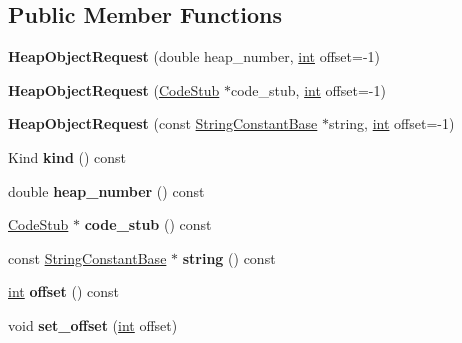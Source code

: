\subsection*{Public Member Functions}
\begin{DoxyCompactItemize}
\item 
\mbox{\label{classv8_1_1internal_1_1HeapObjectRequest_ace092b4cd0caa9792feb64ae2924c3bd}} 
{\bfseries Heap\+Object\+Request} (double heap\+\_\+number, \mbox{\hyperlink{classint}{int}} offset=-\/1)
\item 
\mbox{\label{classv8_1_1internal_1_1HeapObjectRequest_a2011e8f1e651eedc1a57c0babbcf566c}} 
{\bfseries Heap\+Object\+Request} (\mbox{\hyperlink{classv8_1_1internal_1_1CodeStub}{Code\+Stub}} $\ast$code\+\_\+stub, \mbox{\hyperlink{classint}{int}} offset=-\/1)
\item 
\mbox{\label{classv8_1_1internal_1_1HeapObjectRequest_a926a2d70da5522ce8dc0ca0f17d005e6}} 
{\bfseries Heap\+Object\+Request} (const \mbox{\hyperlink{classv8_1_1internal_1_1StringConstantBase}{String\+Constant\+Base}} $\ast$string, \mbox{\hyperlink{classint}{int}} offset=-\/1)
\item 
\mbox{\label{classv8_1_1internal_1_1HeapObjectRequest_a9b24f9541dde0fbb3f796152f462bac5}} 
Kind {\bfseries kind} () const
\item 
\mbox{\label{classv8_1_1internal_1_1HeapObjectRequest_af0c0c84d24b5277381fe3118f557ad6a}} 
double {\bfseries heap\+\_\+number} () const
\item 
\mbox{\label{classv8_1_1internal_1_1HeapObjectRequest_a0760ffe666eda97402127fbbb261d80b}} 
\mbox{\hyperlink{classv8_1_1internal_1_1CodeStub}{Code\+Stub}} $\ast$ {\bfseries code\+\_\+stub} () const
\item 
\mbox{\label{classv8_1_1internal_1_1HeapObjectRequest_af80e4ade6600f1552004ea4519897238}} 
const \mbox{\hyperlink{classv8_1_1internal_1_1StringConstantBase}{String\+Constant\+Base}} $\ast$ {\bfseries string} () const
\item 
\mbox{\label{classv8_1_1internal_1_1HeapObjectRequest_a957659764bca4c25c2091c4d6aeaae46}} 
\mbox{\hyperlink{classint}{int}} {\bfseries offset} () const
\item 
\mbox{\label{classv8_1_1internal_1_1HeapObjectRequest_a7dcfff02d1478e47bc3582f8963fe869}} 
void {\bfseries set\+\_\+offset} (\mbox{\hyperlink{classint}{int}} offset)
\end{DoxyCompactItemize}


